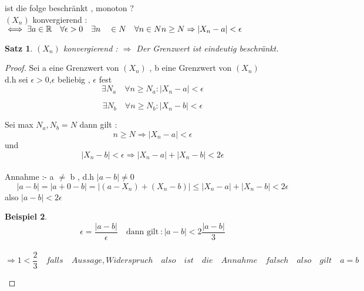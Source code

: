 \documentclass[a4paper,12pt,leqno]{report}
\theoremstyle{plain} %
\newtheorem{theorem}{Satz}[chapter]
\theoremstyle{definition} %
\newtheorem{example}[theorem]{Beispiel}
\begin{document}
\begin{text}
ist die folge beschränkt , monoton ?\\

$(X_n)$ konvergierend : $\iff \exists a \in\mathbb{R} \quad \forall \epsilon > 0 \quad \exists n \quad \in N \quad \forall n \in N \quad \\
 n \geq N \Rightarrow |X_n - a |< \epsilon $
\end{text}

\begin{theorem}

$(X_n)$ konvergierend : $\Rightarrow$ Der Grenzwert ist eindeutig beschränkt.

\end{theorem}

\begin{proof}
Sei a eine Grenzwert von $(X_n)$ , b eine Grenzwert von $(X_n)$ \\
d.h sei $\epsilon > 0$,$\epsilon$ beliebig , $\epsilon$ fest \\

\begin{equation}
\exists  N_a \quad \forall n \geq N_a : |X_n-a|< \epsilon
\end{equation}

\begin{equation}
\exists  N_b \quad \forall n \geq N_b : |X_n-b|< \epsilon
\end{equation}

Sei max ${N_a,N_b}=N$
dann gilt : \\
\begin{equation}
n \geq N \Rightarrow |X_n - a| < \epsilon
\end{equation}
und \begin{equation}
|X_n -b| < \epsilon \Rightarrow |X_n -a|+|X_n - b|< 2\epsilon
\end{equation}\\

Annahme :- a $\neq$ b , d.h $|a-b|\neq 0 $
\[|a-b|=|a+0-b|
=|(a-X_n)+(X_n-b)| \leq |X_n - a|+|X_n-b|< 2 \epsilon \]
also $|a - b|< 2 \epsilon$


\begin{example}
\[\epsilon = \frac{|a-b|}\epsilon
\quad \text{dann gilt}\ :|a-b|<2 \frac{|a-b|}{3}\]\\

\[ \Rightarrow 1 < \frac{2}{3} \quad falls \quad Aussage, Widerspruch \quad also \quad ist \quad die \quad Annahme \quad falsch \quad also \quad gilt \quad a=b\]

\end{example}
\end{proof}
\end{document}
